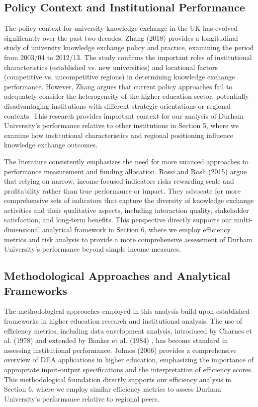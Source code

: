 \documentclass[journal,onecolumn, 10pt,draftclsnofoot]{IEEEtran}
\begin{document}
\subsection{Policy Context and Institutional Performance}

The policy context for university knowledge exchange in the UK has evolved significantly over the past two decades. Zhang (2018) \cite{zhang2018theory} provides a longitudinal study of university knowledge exchange policy and practice, examining the period from 2003/04 to 2012/13. The study confirms the important roles of institutional characteristics (established vs. new universities) and locational factors (competitive vs. uncompetitive regions) in determining knowledge exchange performance. However, Zhang argues that current policy approaches fail to adequately consider the heterogeneity of the higher education sector, potentially disadvantaging institutions with different strategic orientations or regional contexts. This research provides important context for our analysis of Durham University's performance relative to other institutions in Section 5, where we examine how institutional characteristics and regional positioning influence knowledge exchange outcomes.

The literature consistently emphasizes the need for more nuanced approaches to performance measurement and funding allocation. Rossi and Rosli (2015) \cite{rossi2015indicators} argue that relying on narrow, income-focused indicators risks rewarding scale and profitability rather than true performance or impact. They advocate for more comprehensive sets of indicators that capture the diversity of knowledge exchange activities and their qualitative aspects, including interaction quality, stakeholder satisfaction, and long-term benefits. This perspective directly supports our multi-dimensional analytical framework in Section 6, where we employ efficiency metrics and risk analysis to provide a more comprehensive assessment of Durham University's performance beyond simple income measures.

\subsection{Methodological Approaches and Analytical Frameworks}

The methodological approaches employed in this analysis build upon established frameworks in higher education research and institutional analysis. The use of efficiency metrics, including data envelopment analysis, introduced by Charnes et al. (1978) \cite{charnes1978measuring} and extended by Banker et al. (1984) \cite{banker1984models}, has become standard in assessing institutional performance. Johnes (2006) \cite{johnes2006data} provides a comprehensive overview of DEA applications in higher education, emphasizing the importance of appropriate input-output specifications and the interpretation of efficiency scores. This methodological foundation directly supports our efficiency analysis in Section 6, where we employ similar efficiency metrics to assess Durham University's performance relative to regional peers.
\end{document}
